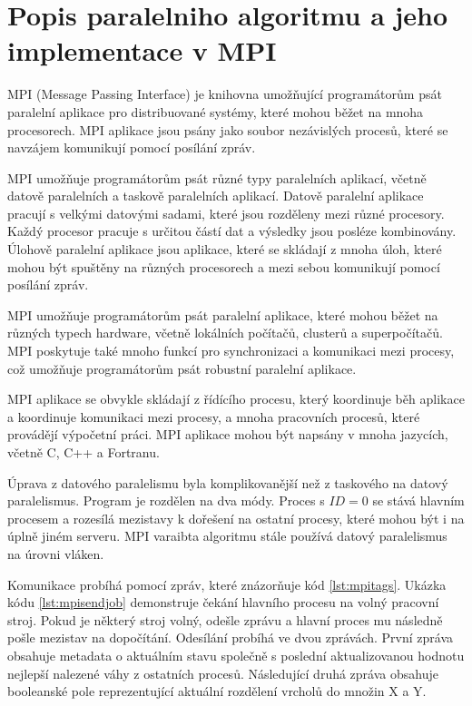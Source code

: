 \documentclass[epsf,epic,eepic,eepicemu]{article}\oddsidemargin=-5mm
\begin{document}
\section{Popis paralelniho algoritmu a jeho implementace v MPI}

MPI (Message Passing Interface) je knihovna umožňující programátorům psát paralelní aplikace pro distribuované systémy, které mohou běžet na mnoha procesorech. MPI aplikace jsou psány jako soubor nezávislých procesů, které se navzájem komunikují pomocí posílání zpráv.

MPI umožňuje programátorům psát různé typy paralelních aplikací, včetně datově paralelních a taskově paralelních aplikací. Datově paralelní aplikace pracují s velkými datovými sadami, které jsou rozděleny mezi různé procesory. Každý procesor pracuje s určitou částí dat a výsledky jsou posléze kombinovány. Úlohově paralelní aplikace jsou aplikace, které se skládají z mnoha úloh, které mohou být spuštěny na různých procesorech a mezi sebou komunikují pomocí posílání zpráv.

MPI umožňuje programátorům psát paralelní aplikace, které mohou běžet na různých typech hardware, včetně lokálních počítačů, clusterů a superpočítačů. MPI poskytuje také mnoho funkcí pro synchronizaci a komunikaci mezi procesy, což umožňuje programátorům psát robustní paralelní aplikace.

MPI aplikace se obvykle skládají z řídícího procesu, který koordinuje běh aplikace a koordinuje komunikaci mezi procesy, a mnoha pracovních procesů, které provádějí výpočetní práci. MPI aplikace mohou být napsány v mnoha jazycích, včetně C, C++ a Fortranu. \cite{mpiwiki}

Úprava z datového paralelismu byla komplikovanější než z taskového na datový paralelismus. Program je rozdělen na dva módy. Proces s $ID = 0$ se stává hlavním procesem a rozesílá mezistavy k dořešení na ostatní procesy, které mohou být i na úplně jiném serveru. MPI varaibta algoritmu stále používá datový paralelismus na úrovni vláken.

Komunikace probíhá pomocí zpráv, které znázorňuje kód \ref{lst:mpitags}. Ukázka kódu \ref{lst:mpisendjob} demonstruje čekání hlavního procesu na volný pracovní stroj. Pokud je některý stroj volný, odešle zprávu a hlavní proces mu následně pošle mezistav na dopočítání. Odesílání probíhá ve dvou zprávách. První zpráva obsahuje metadata o aktuálním stavu společně s poslední aktualizovanou hodnotu nejlepší nalezené váhy z ostatních procesů. Následující druhá zpráva obsahuje booleanské pole reprezentující aktuální rozdělení vrcholů do množin X a Y.
\end{document}
